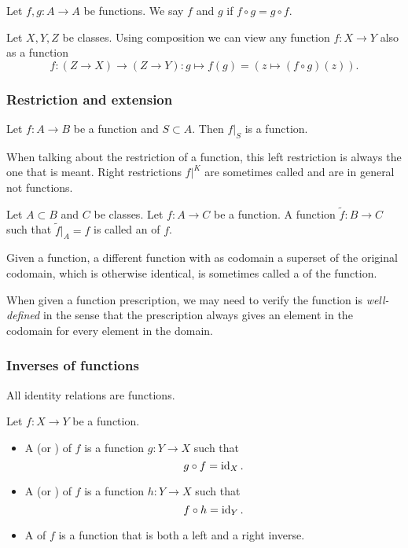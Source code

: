 \begin{definition}
Let $f, g:A\to A$ be functions. We say $f$ and $g$  if $f\circ g = g\circ f$.
\end{definition}

\begin{note}
Let $X,Y,Z$ be classes. Using composition we can view any function $f: X\to Y$ also as a function
\[ f: (Z\to X)\to (Z\to Y): g\mapsto f(g) = (z\mapsto (f\circ g)(z)). \]
\end{note}

\subsubsection{Restriction and extension}
\begin{lemma}
Let $f: A\to B$ be a function and $S\subset A$. Then $f|_S$ is a function.
\end{lemma}
When talking about the restriction of a function, this left restriction is always the one that is meant. Right restrictions $f|^K$ are sometimes called  and are in general not functions.

\begin{definition}
Let $A\subset B$ and $C$ be classes. Let $f: A\to C$ be a function. A function $\tilde{f}: B\to C$ such that $\tilde{f}|_A = f$ is called an  of $f$.
\end{definition}
Given a function, a different function with as codomain a superset of the original codomain, which is otherwise identical, is sometimes called a  of the function.

When given a function prescription, we may need to verify the function is \emph{well-defined} in the sense that the prescription always gives an element in the codomain for every element in the domain.

\subsubsection{Inverses of functions}
All identity relations are functions.

\begin{definition}
Let $f:X\to Y$ be a function.
\begin{itemize}
\item A  (or ) of $f$ is a function $g: Y\to X$ such that
\[ g\circ f = \operatorname{id}_X. \]
\item A  (or ) of $f$ is a function $h: Y\to X$ such that
\[ f\circ h = \operatorname{id}_Y. \]
\item A  of $f$ is a function that is both a left and a right inverse.
\end{itemize}
\end{definition}

